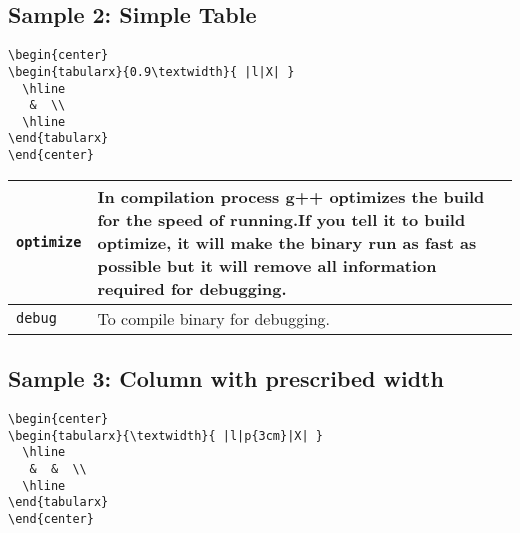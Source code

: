 \vspace*{\baselineskip}
\subsection{Sample 2: Simple Table}


\begin{SBN}
\color{blue}
\begin{verbatim}
\begin{center}
\begin{tabularx}{0.9\textwidth}{ |l|X| }
  \hline
   &  \\ 
  \hline
\end{tabularx}
\end{center}
\end{verbatim}
\end{SBN}

\begin{flushleft}
		\begin{tabularx}{0.9\textwidth}{ |l|X| }
			\hline
			\texttt{optimize}& In compilation process g++ optimizes the build for the speed of running.If you tell it to build optimize, it will make the binary run as fast as
			possible but it will remove all information required for debugging.\\
			\hline   
			\texttt{debug}
			&To compile binary for debugging.\\
			\hline
		\end{tabularx}
\end{flushleft}


\vspace*{\baselineskip}
\subsection{Sample 3: Column with prescribed width}


\begin{SBN}
\color{blue}
\begin{verbatim}
\begin{center}
\begin{tabularx}{\textwidth}{ |l|p{3cm}|X| }
  \hline
   &  &  \\ 
  \hline
\end{tabularx}
\end{center}
\end{verbatim}
\end{SBN}


